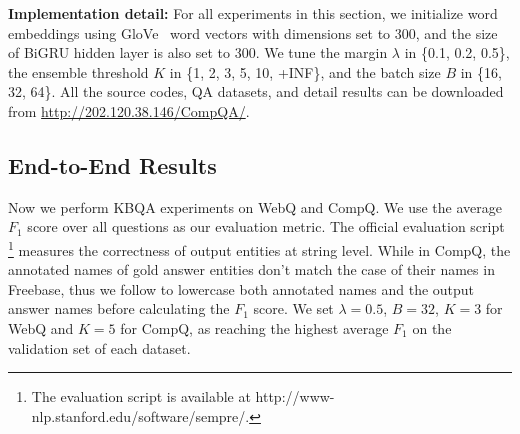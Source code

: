 \textbf{Implementation detail:}
For all experiments in this section,
we initialize word embeddings using GloVe~\cite{pennington2014glove} word vectors
with dimensions set to 300, and the size of BiGRU hidden layer is also set to 300.
We tune the margin $\lambda$ in \{0.1, 0.2, 0.5\},
the ensemble threshold $K$ in \{1, 2, 3, 5, 10, +INF\},
and the batch size $B$ in \{16, 32, 64\}.
All the source codes, QA datasets, and detail results  
can be downloaded from \url{http://202.120.38.146/CompQA/}.



%
%


\subsection{End-to-End Results}

Now we perform KBQA experiments on WebQ and CompQ.
We use the average $F_1$ score over all questions as our evaluation metric.
The official evaluation script 
\footnote{The evaluation script is available at http://www-nlp.stanford.edu/software/sempre/.}
measures the correctness of output entities at string level.
While in CompQ, the annotated names of gold answer entities
don't match the case of their names in Freebase,
thus we follow \citet{bao2016constraint} to lowercase
both annotated names and the output answer names before calculating the $F_1$ score.
We set $\lambda=0.5$, $B=32$, $K=3$ for WebQ and $K=5$ for CompQ,
as reaching the highest average $F_1$ on the validation set of each dataset.


